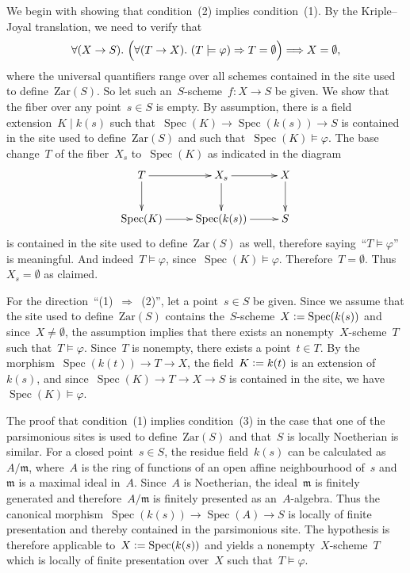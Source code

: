\documentclass[10pt,reqno,a4paper]{amsbook}
\makeatletter
\theoremstyle{definition}
\theoremstyle{plain}
\theoremstyle{remark}
\newcommand{\mmm}{\mathfrak{m}}
\newcommand{\Zar}{\mathrm{Zar}}
\DeclareMathOperator{\Spec}{Spec}
\newcommand{\?}{\,{:}\,}
\renewcommand{\_}{\mathpunct{.}\,}
\newcommand{\fieldext}{\mathrel{|}}
\newcommand{\defeq}{\vcentcolon=}
\renewenvironment{proof}[1][\proofname]{\par
  \pushQED{\qed}%
  \normalfont \topsep6\p@\@plus6\p@\relax
  \trivlist
  \item[\hskip\labelsep
        \itshape
    #1\@addpunct{.}]\ignorespaces
}{%
  \popQED\endtrivlist\@endpefalse
}
\makeatother
\begin{document}
\begin{proof}We begin with showing that condition~(2) implies condition~(1). By
the Kriple--Joyal translation, we need to verify that
\[ \forall (X \to S)\_
  \Bigl(\forall (T \to X)\_ (T \models \varphi) \Rightarrow T = \emptyset\Bigr)
  \Longrightarrow X = \emptyset, \]
where the universal quantifiers range over all schemes contained in the site
used to define~$\Zar(S)$. So let such an~$S$-scheme~$f : X \to S$ be given. We
show that the fiber over any point~$s \in S$ is empty. By assumption, there is
a field extension~$K \fieldext k(s)$ such that~$\Spec(K) \to \Spec(k(s)) \to S$
is contained in the site used to define~$\Zar(S)$ and such that~$\Spec(K)
\models \varphi$. The base change~$T$ of the fiber~$X_s$ to~$\Spec(K)$ as
indicated in the diagram
\[ \xymatrix{
  T \ar[r]\ar[d] & X_s \ar[r]\ar[d] & X \ar[d] \\
  \Spec(K) \ar[r] & \Spec(k(s)) \ar[r] & S
} \]
is contained in the site used to define~$\Zar(S)$ as well, therefore
saying~``$T \models \varphi$'' is meaningful. And indeed~$T \models \varphi$,
since~$\Spec(K) \models \varphi$. Therefore~$T = \emptyset$. Thus~$X_s =
\emptyset$ as claimed.

For the direction~``(1)~$\Rightarrow$~(2)'', let a point~$s \in S$ be given.
Since we assume that the site used to define~$\Zar(S)$ contains
the~$S$-scheme~$X \defeq \Spec(k(s))$ and since~$X \neq \emptyset$, the
assumption implies that there exists an nonempty~$X$-scheme~$T$ such that~$T
\models \varphi$.  Since~$T$ is nonempty, there exists a point~$t \in T$. By
the morphism~$\Spec(k(t)) \to T \to X$, the field~$K \defeq k(t)$ is an
extension of~$k(s)$, and since~$\Spec(K) \to T \to X \to S$ is contained in the
site, we have~$\Spec(K) \models \varphi$.

The proof that condition~(1) implies condition~(3) in the case that one of the
parsimonious sites is used to define~$\Zar(S)$ and that~$S$ is locally
Noetherian is similar. For a closed point~$s \in S$, the residue field~$k(s)$
can be calculated as~$A/\mmm$, where~$A$ is the ring of functions of an open
affine neighbourhood of~$s$ and~$\mmm$ is a maximal ideal in~$A$. Since~$A$ is
Noetherian, the ideal~$\mmm$ is finitely generated and therefore~$A/\mmm$ is
finitely presented as an~$A$-algebra. Thus the canonical morphism~$\Spec(k(s))
\to \Spec(A) \to S$ is locally of finite presentation and thereby contained in
the parsimonious site. The hypothesis is therefore applicable to~$X \defeq
\Spec(k(s))$ and yields a nonempty~$X$-scheme~$T$ which is locally of finite
presentation over~$X$ such that~$T \models \varphi$.


\end{proof}
\end{document}
